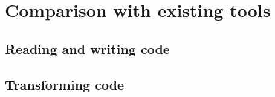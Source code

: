 \chapter{Comparison with existing tools}

\section{Reading and writing code}

\section{Transforming code}